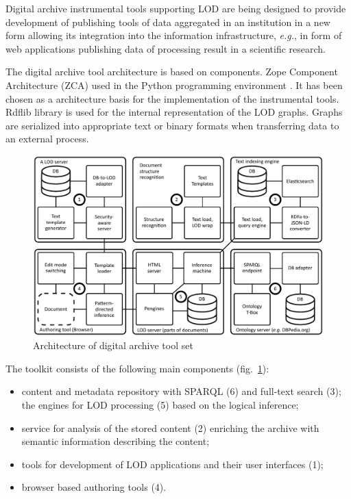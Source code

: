 \documentclass[conference,a4paper]{IEEEtran}
\begin{document}
Digital archive instrumental tools supporting LOD are being designed to provide development of publishing tools of data aggregated in an institution in a new form allowing its integration into the information infrastructure, \emph{e.g.}, in form of web applications publishing data of processing result in a scientific research.

The digital archive tool architecture is based on components. Zope Component Architecture (ZCA) \cite{b6} used in the Python programming environment \cite{b7}.  It has been chosen as a architecture basis for the implementation of the instrumental tools.  Rdflib library is used for the internal representation of the LOD graphs.  Graphs are serialized into appropriate text or binary formats when transferring data to an external process.

\begin{figure}
  \begin{center}
  \includegraphics[width=1\linewidth]{architecture-mda-lod-ext.pdf}
  \caption{Architecture of digital archive tool set} \label{fig:arch}
\end{center}
\end{figure}

The toolkit consists of the following main components (fig.~\ref{fig:arch}):
\begin{itemize}
\item content and metadata repository with SPARQL (6) and full-text search (3); the engines for LOD processing (5) based on the logical inference;
\item service for analysis of the stored content (2) enriching the archive with semantic information describing the content;
\item tools for development of LOD applications and their user interfaces (1);
\item browser based authoring tools (4).
\end{itemize}
\end{document}
